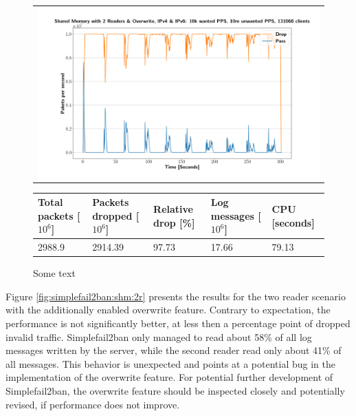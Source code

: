\pagebreak

\begin{figure}[!h]
	\centering
	\scriptsize
	\begin{tabular}{c}
    	\centerline{\includegraphics[width=1.2\textwidth]{images/simplefail2ban_shm_2r_or_ipv46_v10k_iv10m_c131068.png}}
	\end{tabular}
	\begin{tabular}{lllll}
		\toprule
		\textbf{Total packets [$10^6$]} & \textbf{Packets dropped [$10^6$]} & \textbf{Relative drop [\%]} & \textbf{Log messages [$10^6$]} & \textbf{CPU [seconds]} \\ \midrule 
		2988.9 & 2914.39 & 97.73 & 17.66 & 79.13 \\
		\bottomrule
	\end{tabular}
	\caption[Simplefail2ban, Shared Memory 2 Readers with Overwrite]{Some text}
	\label{fig:simplefail2ban:shm:or}
\end{figure}

Figure \ref{fig:simplefail2ban:shm:2r} presents the results for the two reader scenario with the additionally enabled overwrite feature. Contrary to expectation,
the performance is not significantly better, at less then a percentage point of dropped invalid traffic. Simplefail2ban only managed to read about 58\% of all log messages 
written by the server, while the second reader read only about 41\% of all messages. This behavior is unexpected and points at a potential bug in the implementation of the overwrite
feature. For potential further development of Simplefail2ban, the overwrite feature should be inspected closely and potentially revised, if performance does not improve. 

\pagebreak

